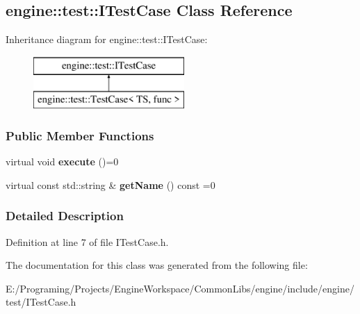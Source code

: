 \hypertarget{a00054}{}\subsection{engine\+:\+:test\+:\+:I\+Test\+Case Class Reference}
\label{a00054}
Inheritance diagram for engine\+:\+:test\+:\+:I\+Test\+Case\+:\begin{figure}[H]
\begin{center}
\leavevmode
\includegraphics[height=2.000000cm]{a00054}
\end{center}
\end{figure}
\subsubsection*{Public Member Functions}
\begin{DoxyCompactItemize}
\item 
virtual void {\bfseries execute} ()=0\hypertarget{a00054_a7e50dee56c82bb195fd99c1137fd657c}{}\label{a00054_a7e50dee56c82bb195fd99c1137fd657c}

\item 
virtual const std\+::string \& {\bfseries get\+Name} () const  =0\hypertarget{a00054_a224b4ed84824c244fbc68400f9e45eca}{}\label{a00054_a224b4ed84824c244fbc68400f9e45eca}

\end{DoxyCompactItemize}


\subsubsection{Detailed Description}


Definition at line 7 of file I\+Test\+Case.\+h.



The documentation for this class was generated from the following file\+:\begin{DoxyCompactItemize}
\item 
E\+:/\+Programing/\+Projects/\+Engine\+Workspace/\+Common\+Libs/engine/include/engine/test/I\+Test\+Case.\+h\end{DoxyCompactItemize}
